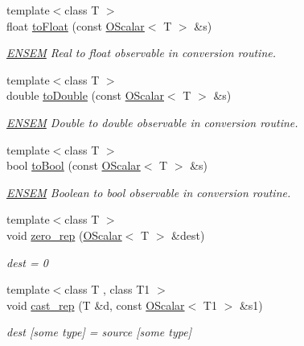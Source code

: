 \begin{DoxyCompactItemize}
{\footnotesize template$<$class T $>$ }\\float \mbox{\hyperlink{group__obsscalar_ga8a5fa51c51286eaa85647e050a9b3afd}{to\+Float}} (const \mbox{\hyperlink{classENSEM_1_1OScalar}{O\+Scalar}}$<$ T $>$ \&s)
\begin{DoxyCompactList}\small\item\em \mbox{\hyperlink{namespaceENSEM}{E\+N\+S\+EM}} Real to float observable in conversion routine. \end{DoxyCompactList}\item 
{\footnotesize template$<$class T $>$ }\\double \mbox{\hyperlink{group__obsscalar_gad40ee3f4578e710aa6f83e848e14282b}{to\+Double}} (const \mbox{\hyperlink{classENSEM_1_1OScalar}{O\+Scalar}}$<$ T $>$ \&s)
\begin{DoxyCompactList}\small\item\em \mbox{\hyperlink{namespaceENSEM}{E\+N\+S\+EM}} Double to double observable in conversion routine. \end{DoxyCompactList}\item 
{\footnotesize template$<$class T $>$ }\\bool \mbox{\hyperlink{group__obsscalar_ga8fa5feb767fc8b3814940792eddf13c8}{to\+Bool}} (const \mbox{\hyperlink{classENSEM_1_1OScalar}{O\+Scalar}}$<$ T $>$ \&s)
\begin{DoxyCompactList}\small\item\em \mbox{\hyperlink{namespaceENSEM}{E\+N\+S\+EM}} Boolean to bool observable in conversion routine. \end{DoxyCompactList}\item 
{\footnotesize template$<$class T $>$ }\\void \mbox{\hyperlink{group__obsscalar_ga752f81e54e6f8f8362126b8d0668b340}{zero\+\_\+rep}} (\mbox{\hyperlink{classENSEM_1_1OScalar}{O\+Scalar}}$<$ T $>$ \&dest)
\begin{DoxyCompactList}\small\item\em dest = 0 \end{DoxyCompactList}\item 
{\footnotesize template$<$class T , class T1 $>$ }\\void \mbox{\hyperlink{group__obsscalar_gaf1b78a4937f88c01ae3300374d58d7f2}{cast\+\_\+rep}} (T \&d, const \mbox{\hyperlink{classENSEM_1_1OScalar}{O\+Scalar}}$<$ T1 $>$ \&s1)
\begin{DoxyCompactList}\small\item\em dest \mbox{[}some type\mbox{]} = source \mbox{[}some type\mbox{]} \end{DoxyCompactList}\item 

\end{DoxyCompactItemize}
